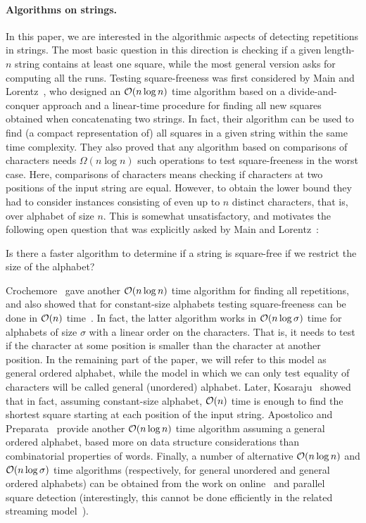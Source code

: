 \paragraph{Algorithms on strings.}
In this paper, we are interested in the algorithmic aspects of detecting repetitions in strings. The most basic question
in this direction is checking if a given length-$n$ string contains at least one square,
while the most general version asks for computing all the runs.
Testing square-freeness was
first considered by Main and Lorentz~\cite{Main1984}, who designed an $\mathcal{O}(n\log n)$ time algorithm based on
a divide-and-conquer approach and a linear-time procedure for finding all new squares obtained when concatenating
two strings. In fact, their algorithm can be used to find (a compact representation of) all squares in a given string
within the same time complexity. They also proved that any algorithm based on comparisons of characters needs
$\Omega(n\log n)$ such operations to test square-freeness in the worst case. Here, comparisons of characters means
checking if characters at two positions of the input string are equal. However, to obtain the lower bound they
had to consider instances consisting of even up to $n$ distinct characters, that is, over alphabet of size $n$.
This is somewhat unsatisfactory, and motivates the following open question that was explicitly asked by Main and Lorentz~\cite{Main1984}:

\begin{question}
Is there a faster algorithm to determine if a string is square-free if we restrict the size of the alphabet?
\end{question}

Crochemore~\cite{Crochemore1981} gave another $\mathcal{O}(n\log n)$ time algorithm for finding all repetitions,
and also showed that for constant-size alphabets testing square-freeness can be done in  $\mathcal{O}(n)$ time~\cite{Crochemore1986}.
In fact, the latter algorithm works in $\mathcal{O}(n\log \sigma)$ time for alphabets of size $\sigma$ with a linear order on the characters.
That is, it needs to test if the character at some position is smaller than the character at another position.
In the remaining part of the paper, we will refer to this model as general ordered alphabet, while the model
in which we can only test equality of characters will be called general (unordered) alphabet.
Later, Kosaraju~\cite{Kosaraju1994} showed that in fact, assuming constant-size alphabet, $\mathcal{O}(n)$ time is enough
to find the shortest square starting at each position of the input string.
Apostolico and Preparata~\cite{Apostolico1983} provide another $\mathcal{O}(n\log n)$ time algorithm assuming a general ordered alphabet,
based more on data structure considerations than combinatorial properties of words.
Finally, a number of alternative $\mathcal{O}(n\log n)$ and $\mathcal{O}(n\log \sigma)$ time algorithms (respectively, for general unordered
and general ordered alphabets) can be obtained from the work on online~\cite{Hong2008,Kosolobov2014,Kosolobov2015a}
and parallel~\cite{Apostolico1996} square detection (interestingly, this cannot be done efficiently in the related
streaming model~\cite{DBLP:conf/spire/MerkurevS19,Merkurev2022}).

